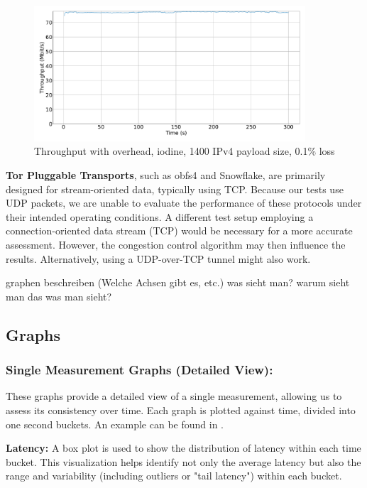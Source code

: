 \begin{figure}[tbh]
	\centering
	\includegraphics[draft=false,width=0.9\textwidth]{figures/Graphs/graph-3-iodine-constant-throughput/throughput.pdf}
	\caption{Throughput with overhead, iodine, 1400 IPv4 payload size, 0.1\% loss}
	\label{fig:graph-3-iodine-constant-throughput}
\end{figure}


\textbf{Tor Pluggable Transports}, such as obfs4 and Snowflake, are primarily designed for stream-oriented data, typically using TCP.
Because our tests use UDP packets, we are unable to evaluate the performance of these protocols under their intended operating conditions.
A different test setup employing a connection-oriented data stream (TCP) would be necessary for a more accurate assessment.
However, the congestion control algorithm may then influence the results.
Alternatively, using a UDP-over-TCP tunnel might also work.




graphen beschreiben (Welche Achsen gibt es, etc.)
was sieht man?
warum sieht man das was man sieht?

\subsection{Graphs}
\subsubsection{Single Measurement Graphs (Detailed View):}
These graphs provide a detailed view of a single measurement, allowing us to assess its consistency over time.
Each graph is plotted against time, divided into one second buckets.
An example can be found in .

\noindent\textbf{Latency:} A box plot is used to show the distribution of latency within each time bucket.
This visualization helps identify not only the average latency but also the range and variability (including outliers or "tail latency") within each bucket.

